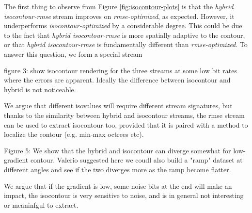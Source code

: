 The first thing to observe from Figure \ref{fig:isocontour-plots} is that the \emph{hybrid
isocontour-rmse} stream improves on \emph{rmse-optimized}, as expected. However, it underperforms
\emph{isocontour-optimized} by a considerable degree. This could be due to the fact that
\emph{hybrid isocontour-rmse} is more spatially adaptive to the contour, or that \emph{hybrid
isocontour-rmse} is fundamentally different than \emph{rmse-optimized}. To answer this question, we
form a special stream 

figure 3: show isocontour rendering for the three streams at some low bit rates where the errors are
apparent. Ideally the difference between isocontour and hybrid is not noticeable.

We argue that different isovalues will require different stream signatures, but thanks to the
similarity between hybrid and isocontour streams, the rmse stream can be used to extract isocontour
too, provided that it is paired with a method to localize the contour (e.g. min-max octrees etc).

Figure 5: We show that the hybrid and isocontour can diverge somewhat for low-gradient contour.
Valerio suggested here we coudl also build a "ramp" dataset at different angles and see if the two
diverges more as the ramp become flatter.

We argue that if the gradient is low, some noise bits at the end will make an impact, the isocontour
is very sensitive to noise, and is in general not interesting or meaninfgul to extract.
